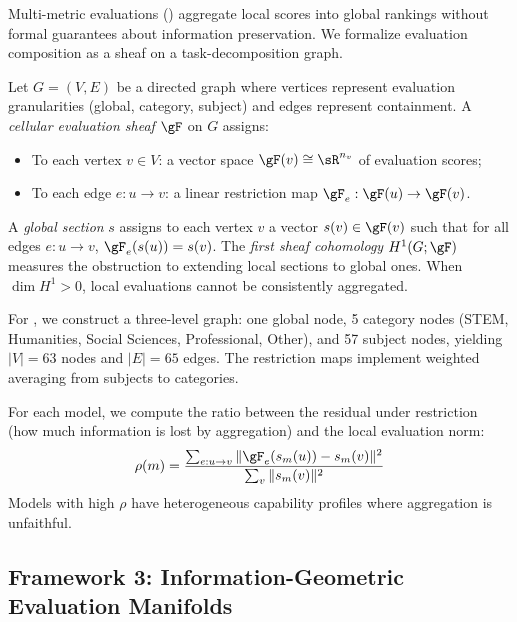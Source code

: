 Multi-metric evaluations (\eg \helm) aggregate local scores into global rankings without formal guarantees about information preservation.
We formalize evaluation composition as a sheaf on a task-decomposition graph.

\begin{definition}
Let $G = (V, E)$ be a directed graph where vertices represent evaluation granularities (global, category, subject) and edges represent containment.
A \emph{cellular evaluation sheaf} $\gF$ on $G$ assigns:
\begin{itemize}[leftmargin=*,itemsep=0pt,topsep=0pt]
    \item To each vertex $v \in V$: a vector space $\gF(v) \cong \sR^{n_v}$ of evaluation scores;
    \item To each edge $e: u \to v$: a linear restriction map $\gF_{e}: \gF(u) \to \gF(v)$.
\end{itemize}
\end{definition}

\begin{definition}
A \emph{global section} $s$ assigns to each vertex $v$ a vector $s(v) \in \gF(v)$ such that for all edges $e: u \to v$, $\gF_e(s(u)) = s(v)$.
The \emph{first sheaf cohomology} $H^1(G; \gF)$ measures the obstruction to extending local sections to global ones.
When $\dim H^1 > 0$, local evaluations cannot be consistently aggregated.
\end{definition}

For \mmlu, we construct a three-level graph: one global node, 5 category nodes (STEM, Humanities, Social Sciences, Professional, Other), and 57 subject nodes, yielding $|V| = 63$ nodes and $|E| = 65$ edges.
The restriction maps implement weighted averaging from subjects to categories.

For each model, we compute the ratio between the residual under restriction (how much information is lost by aggregation) and the local evaluation norm:
\begin{equation}
\rho(m) = \frac{\sum_{e: u \to v} \|\gF_e(s_m(u)) - s_m(v)\|^2}{\sum_{v} \|s_m(v)\|^2}
\end{equation}
Models with high $\rho$ have heterogeneous capability profiles where aggregation is unfaithful.

\subsection{Framework 3: Information-Geometric Evaluation Manifolds}
\label{sec:fisheval}

